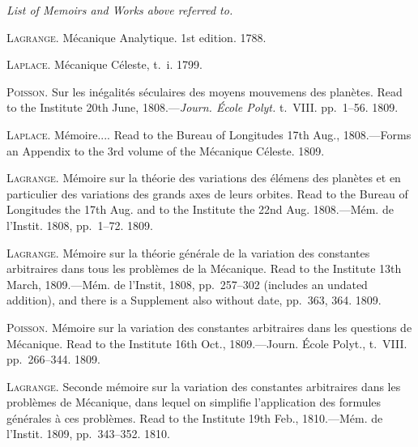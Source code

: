 \documentclass[12pt,a4paper]{article}
\theoremstyle{definition}
\begin{document}
\begin{center}
\textit{List of Memoirs and Works above referred to.}
\end{center}

\medskip

\noindent\textsc{Lagrange}. M\'ecanique Analytique. 1st edition. 1788.

\smallskip

\noindent\textsc{Laplace}. M\'ecanique C\'eleste, t.~i. 1799.

\smallskip

\noindent\textsc{Poisson}. Sur les in\'egalit\'es s\'eculaires des moyens mouvemens des plan\`etes. Read to
the Institute 20th June, 1808.---\textit{Journ. \'Ecole Polyt.} t.~VIII. pp.~1--56. 1809.

\smallskip

\noindent\textsc{Laplace}. M\'emoire.... Read to the Bureau of Longitudes 17th Aug., 1808.---Forms
an Appendix to the 3rd volume of the M\'ecanique C\'eleste. 1809.

\smallskip

\noindent\textsc{Lagrange}. M\'emoire sur la th\'eorie des variations des \'el\'emens des plan\`etes et en
particulier des variations des grands axes de leurs orbites. Read to the Bureau
of Longitudes the 17th Aug. and to the Institute the 22nd Aug. 1808.---M\'em.
de l'Instit. 1808, pp.~1--72. 1809.

\smallskip

\noindent\textsc{Lagrange}. M\'emoire sur la th\'eorie g\'en\'erale de la variation des constantes arbitraires
dans tous les probl\`emes de la M\'ecanique. Read to the Institute 13th March,
1809.---M\'em. de l'Instit, 1808, pp.~257--302 (includes an undated addition), and
there is a Supplement also without date, pp.~363, 364. 1809.

\smallskip

\noindent\textsc{Poisson}. M\'emoire sur la variation des constantes arbitraires dans les questions de
M\'ecanique. Read to the Institute 16th Oct., 1809.---Journ. \'Ecole Polyt., t.~VIII.
pp.~266--344. 1809.

\smallskip

\noindent\textsc{Lagrange}. Seconde m\'emoire sur la variation des constantes arbitraires dans les
probl\`emes de M\'ecanique, dans lequel on simplifie l'application des formules g\'en\'erales
\`a ces probl\`emes. Read to the Institute 19th Feb., 1810.---M\'em. de l'Instit. 1809,
pp.~343--352. 1810.

\smallskip
\end{document}
